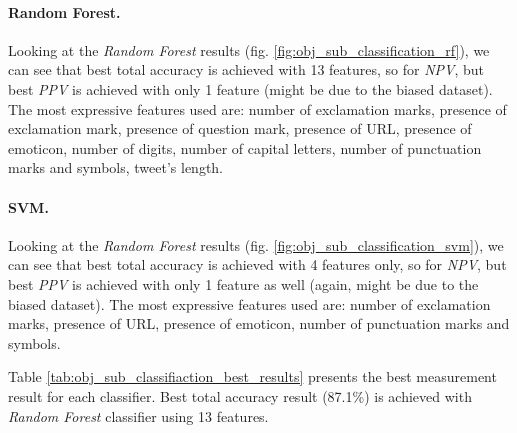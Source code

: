 \documentclass[letterpaper,twocolumn,10pt]{article}
\begin{document}
\paragraph{Random Forest.} Looking at the \textit{Random Forest} results (fig.  \ref{fig:obj_sub_classification_rf}), we can see that best total accuracy is achieved with 13 features, so for \textit{NPV}, but best \textit{PPV} is achieved with only 1 feature (might be due to the biased dataset). The most expressive features used are:
number of exclamation marks, presence of exclamation mark, presence of question mark, presence of URL, presence of emoticon, number of digits, number of capital letters, number of punctuation marks and symbols, tweet's length.

\paragraph{SVM.} Looking at the \textit{Random Forest} results (fig.  \ref{fig:obj_sub_classification_svm}), we can see that best total accuracy is achieved with 4 features only, so for \textit{NPV}, but best \textit{PPV} is achieved with only 1 feature as well (again, might be due to the biased dataset). The most expressive features used are:
number of exclamation marks, presence of URL, presence of emoticon, number of punctuation marks and symbols.

Table \ref{tab:obj_sub_classifiaction_best_results} presents the best measurement result for each classifier. Best total accuracy result (87.1\%) is achieved with \textit{Random Forest} classifier using 13 features. \\

\begin{table}[H]

	\begin{center}
	\end{center}
	\caption{Objective/Subjective Classification Best Results (in parentheses - number of features used)} 	\label{tab:obj_sub_classifiaction_best_results}
\end{table}
\end{document}
